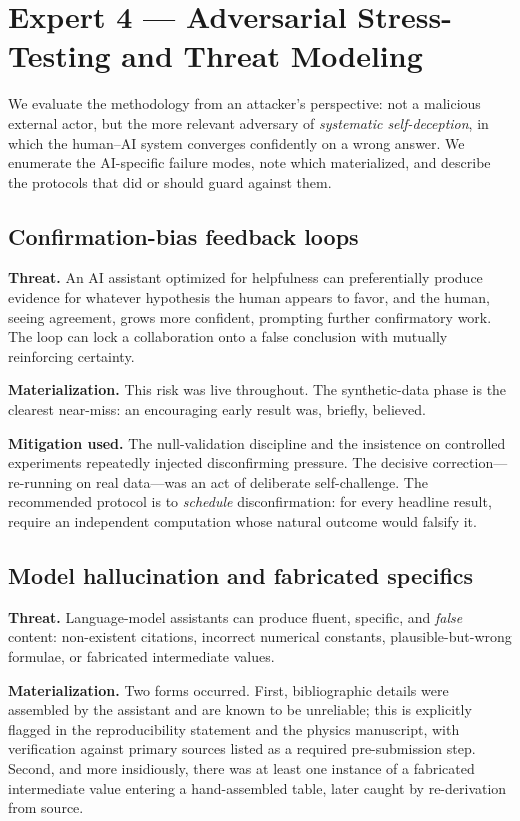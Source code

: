 \documentclass[11pt]{article}
\begin{document}
\section{Expert 4 --- Adversarial Stress-Testing and Threat Modeling}
\label{sec:redteam}

We evaluate the methodology from an attacker's perspective: not a malicious external
actor, but the more relevant adversary of \emph{systematic self-deception}, in which
the human--AI system converges confidently on a wrong answer. We enumerate the
AI-specific failure modes, note which materialized, and describe the protocols that
did or should guard against them.

\subsection{Confirmation-bias feedback loops}

\textbf{Threat.} An AI assistant optimized for helpfulness can preferentially
produce evidence for whatever hypothesis the human appears to favor, and the human,
seeing agreement, grows more confident, prompting further confirmatory work. The
loop can lock a collaboration onto a false conclusion with mutually reinforcing
certainty.

\textbf{Materialization.} This risk was live throughout. The synthetic-data phase
is the clearest near-miss: an encouraging early result was, briefly, believed.

\textbf{Mitigation used.} The null-validation discipline and the insistence on
controlled experiments repeatedly injected disconfirming pressure. The decisive
correction---re-running on real data---was an act of deliberate self-challenge. The
recommended protocol is to \emph{schedule} disconfirmation: for every headline
result, require an independent computation whose natural outcome would falsify it.

\subsection{Model hallucination and fabricated specifics}

\textbf{Threat.} Language-model assistants can produce fluent, specific, and
\emph{false} content: non-existent citations, incorrect numerical constants,
plausible-but-wrong formulae, or fabricated intermediate values.

\textbf{Materialization.} Two forms occurred. First, bibliographic details were
assembled by the assistant and are known to be unreliable; this is explicitly
flagged in the reproducibility statement and the physics manuscript, with
verification against primary sources listed as a required pre-submission step.
Second, and more insidiously, there was at least one instance of a
fabricated intermediate value entering a hand-assembled table, later caught by
re-derivation from source.
\end{document}
